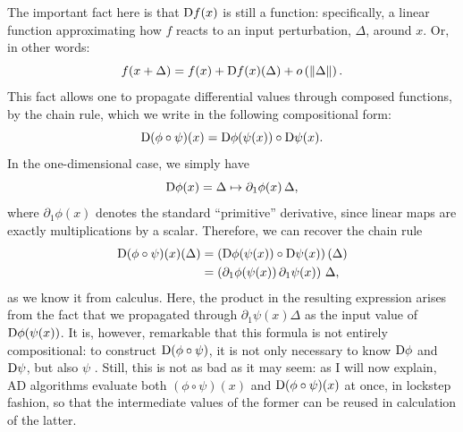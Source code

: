 The important fact here is that \(\mathop{}\!\mathrm{D} f(x)\) is still a function: specifically, a linear function
approximating how \(f\) reacts to an input perturbation, \(\Delta\), around \(x\).  Or, in other
words:
\begin{equation}
  f(x + \Delta) = f(x) + \mathop{}\!\mathrm{D} f(x)(\Delta) + o\left(\left\lVert\Delta\right\rVert\right).
\end{equation}
This fact allows one to propagate differential values through composed functions, by the chain rule,
which we write in the following compositional form:
\begin{equation}
  \mathop{}\!\mathrm{D}(\phi \circ \psi)(x) = \mathop{}\!\mathrm{D}\phi(\psi(x)) \circ \mathop{}\!\mathrm{D}\psi(x).
\end{equation}
In the one-dimensional case, we simply have
\begin{equation}
  \mathop{}\!\mathrm{D} \phi(x) = \Delta \mapsto \partial_1 \phi(x) \, \Delta,
\end{equation}
where \(\partial_1 \phi(x)\) denotes the standard \enquote{primitive} derivative, since linear maps
are exactly multiplications by a scalar.  Therefore, we can recover the chain rule
\begin{equation}
  \begin{aligned}
    \mathop{}\!\mathrm{D}(\phi \circ \psi)(x)(\Delta) &=
    \left( \mathop{}\!\mathrm{D}\phi(\psi(x)) \circ \mathop{}\!\mathrm{D}\psi(x) \right)(\Delta) \\
    &= \left( \partial_1\phi(\psi(x)) \, \partial_1 \psi(x) \right) \, \Delta,
  \end{aligned}
\end{equation}
as we know it from calculus.  Here, the product in the resulting expression arises from the fact
that we propagated through \(\partial_1 \psi(x) \Delta\) as the input value of
\(\mathop{}\!\mathrm{D}\phi(\psi(x))\).  It is, however, remarkable that this formula is not entirely compositional:
to construct \(\mathop{}\!\mathrm{D}(\phi \circ \psi)\), it is not only necessary to know \(\mathop{}\!\mathrm{D}\phi\) and
\(\mathop{}\!\mathrm{D}\psi\), but also \(\psi\) \parencite{elliott2018simple}.  Still, this is not as bad as it may
seem: as I will now explain, AD algorithms evaluate both \((\phi \circ \psi)(x)\) and
\(\mathop{}\!\mathrm{D}(\phi \circ \psi)(x)\) at once, in lockstep fashion, so that the intermediate values of the
former can be reused in calculation of the latter.

